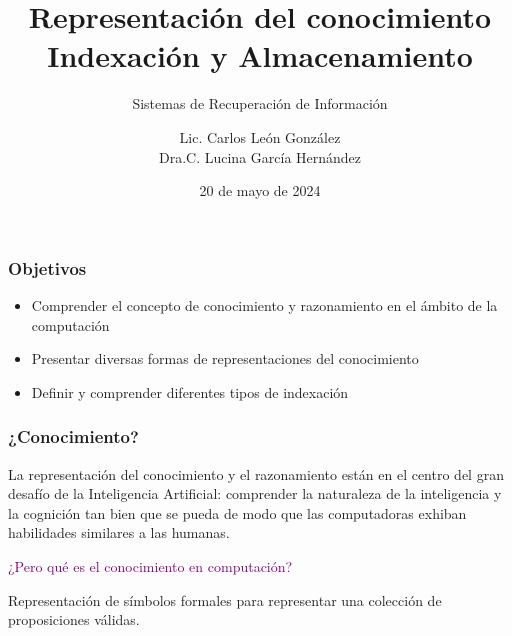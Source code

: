 \documentclass[
10pt, %
aspectratio=169, %
]{beamer}
\title[Short Title]{Representación del conocimiento \\ Indexación y Almacenamiento}
\subtitle{Sistemas de Recuperación de Información}
\author{Lic. Carlos León González \\ Dra.C. Lucina García Hernández}
\institute[UC]{Facultad de Matem\'atica y Computaci\'on \\ Universidad de La Habana \\ \smallskip }
\date{20 de mayo de  2024} %
\begin{document}
	
	
	
	\begin{frame}
		\titlepage
	\end{frame}
	
	\begin{frame}
		
		\frametitle{Objetivos}
		
		\begin{itemize}

			\item Comprender el concepto de conocimiento y razonamiento en el ámbito de la computación
			
			\item Presentar diversas formas de representaciones del conocimiento
			
			\item Definir y comprender diferentes tipos de indexación
						
		\end{itemize}
		
	\end{frame}
	
	\begin{frame}
		
		\frametitle{¿Conocimiento?}
		
		La representación del conocimiento y el razonamiento están en el centro del gran desafío de la Inteligencia Artificial: comprender la naturaleza de la inteligencia y la cognición tan bien que se pueda de modo que las computadoras exhiban habilidades similares a las humanas.
		
		\pause
		\vspace{2\baselineskip}
		\textcolor{purple}{¿Pero qué es el conocimiento en computación?}
		
		
		\pause
		\begin{alertblock}{}
			Representación de símbolos formales para representar una colección de proposiciones válidas.
		\end{alertblock}
		
	\end{frame}
	
\end{document}

